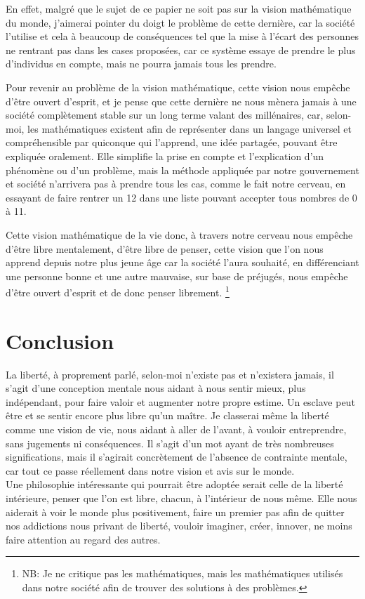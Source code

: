 \documentclass[]{liberty}
\begin{document}
En effet, malgré que le sujet de ce papier ne soit pas sur la vision 
mathématique du monde, j'aimerai pointer du doigt le problème de cette dernière, car la société 
l'utilise et cela à beaucoup de conséquences tel que la mise à l'écart des personnes ne rentrant
pas dans les cases proposées, car ce système essaye de prendre le plus d'individus en compte, mais 
ne pourra jamais tous les prendre.\newline 

Pour revenir au problème de la vision mathématique, cette 
vision nous empêche d'être ouvert d'esprit, et je pense que cette dernière ne nous mènera jamais
à une société complètement stable sur un long terme valant des millénaires, car, selon-moi, les 
mathématiques existent afin de représenter dans un langage universel et compréhensible par quiconque 
qui l'apprend, une idée partagée, pouvant être expliquée oralement. Elle simplifie la prise en compte 
et l'explication d'un phénomène ou d'un problème, mais la méthode appliquée par notre gouvernement 
et société n'arrivera pas à prendre tous les cas, comme le fait notre cerveau, en essayant de faire 
rentrer un 12 dans une liste pouvant accepter tous nombres de 0 à 11.\newline 

Cette vision mathématique de la vie donc, à travers notre cerveau nous empêche d'être libre 
mentalement, d'être libre de penser, cette vision que l'on nous apprend depuis notre plus 
jeune âge car la société l'aura souhaité, en différenciant une personne bonne et une autre
mauvaise, sur base de préjugés, nous empêche d'être ouvert d'esprit et de donc penser 
librement.\newline
\footnote{ 
  NB: Je ne critique pas les mathématiques, mais les mathématiques utilisés dans notre société
  afin de trouver des solutions à des problèmes.
}

\section*{Conclusion}
La liberté, à proprement parlé, selon-moi n'existe pas et n'existera jamais, il s'agit d'une 
conception mentale nous aidant à nous sentir mieux, plus indépendant, pour faire valoir et augmenter 
notre propre estime. Un esclave peut être et se sentir encore plus libre qu'un maître. Je classerai
même la liberté comme une vision de vie, nous aidant à aller de l'avant, à vouloir entreprendre,
sans jugements ni conséquences. Il s'agit d'un mot ayant de très nombreuses significations, mais
il s'agirait concrètement de l'absence de contrainte mentale, car tout ce passe réellement dans 
notre vision et avis sur le monde. \\ Une philosophie intéressante qui pourrait être adoptée 
serait celle de la liberté intérieure, penser que l'on est libre, chacun, à l'intérieur de nous 
même. Elle nous aiderait à voir le monde plus positivement, faire un premier pas afin de quitter
nos addictions nous privant de liberté, vouloir imaginer, créer, innover, ne moins faire attention
au regard des autres.
\end{document}
